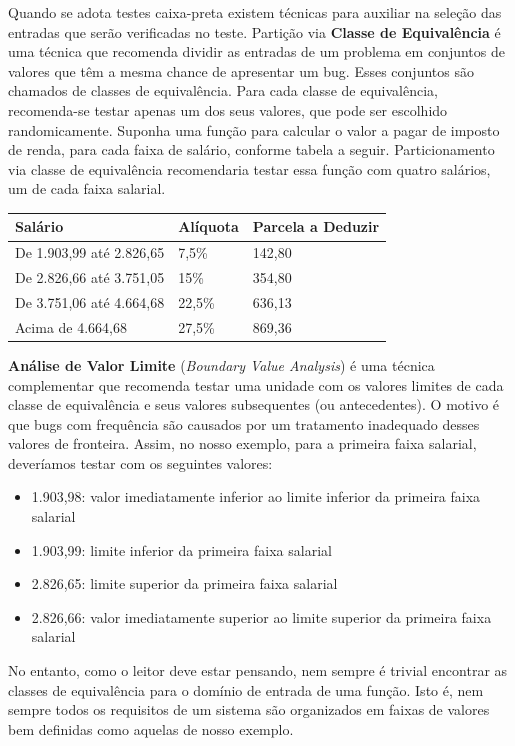 \documentclass[
  11pt,
  twoside]{book}
\providecommand{\tightlist}{%
  \setlength{\itemsep}{0pt}\setlength{\parskip}{0pt}}
\begin{document}

Quando se adota testes caixa-preta existem técnicas para auxiliar na
seleção das entradas que serão verificadas no teste. Partição via
\textbf{Classe de Equivalência} é uma técnica que recomenda dividir as
entradas de um problema em conjuntos de valores que têm a mesma chance
de apresentar um bug. Esses conjuntos são chamados de classes de
equivalência. Para cada classe de equivalência, recomenda-se testar
apenas um dos seus valores, que pode ser escolhido randomicamente.
Suponha uma função para calcular o valor a pagar de imposto de renda,
para cada faixa de salário, conforme tabela a seguir. Particionamento
via classe de equivalência recomendaria testar essa função com quatro
salários, um de cada faixa salarial.

\begin{longtable}[]{@{}lll@{}}
\toprule
\textbf{Salário} & \textbf{Alíquota} & \textbf{Parcela a
Deduzir}\tabularnewline
\midrule
\endhead
De 1.903,99 até 2.826,65 & 7,5\% & 142,80\tabularnewline
De 2.826,66 até 3.751,05 & 15\% & 354,80\tabularnewline
De 3.751,06 até 4.664,68 & 22,5\% & 636,13\tabularnewline
Acima de 4.664,68 & 27,5\% & 869,36\tabularnewline
\bottomrule
\end{longtable}

 \textbf{Análise de Valor Limite}
(\emph{Boundary Value Analysis}) é uma técnica complementar que
recomenda testar uma unidade com os valores limites de cada classe de
equivalência e seus valores subsequentes (ou antecedentes). O motivo é
que bugs com frequência são causados por um tratamento inadequado desses
valores de fronteira. Assim, no nosso exemplo, para a primeira faixa
salarial, deveríamos testar com os seguintes valores:

\begin{itemize}
\tightlist
\item
  1.903,98: valor imediatamente inferior ao limite inferior da primeira
  faixa salarial
\item
  1.903,99: limite inferior da primeira faixa salarial
\item
  2.826,65: limite superior da primeira faixa salarial
\item
  2.826,66: valor imediatamente superior ao limite superior da primeira
  faixa salarial
\end{itemize}

No entanto, como o leitor deve estar pensando, nem sempre é trivial
encontrar as classes de equivalência para o domínio de entrada de uma
função. Isto é, nem sempre todos os requisitos de um sistema são
organizados em faixas de valores bem definidas como aquelas de nosso
exemplo.
\end{document}
